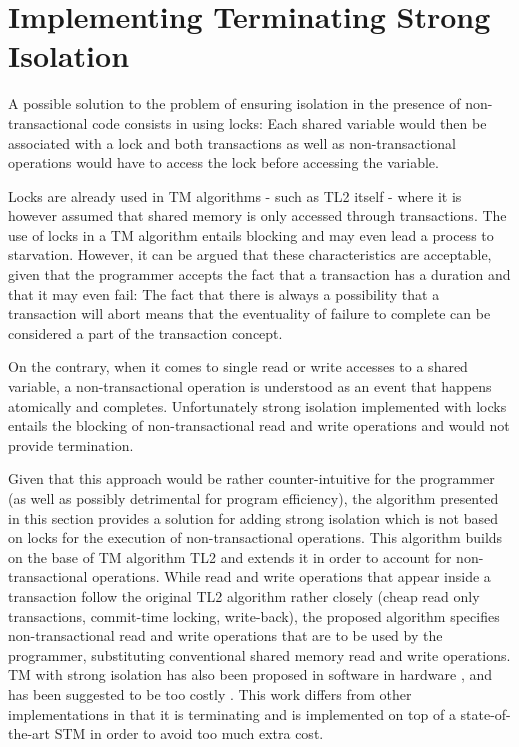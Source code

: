 \section{Implementing Terminating Strong  Isolation}
\label{sec:protocol}

A possible  solution to  the problem of  ensuring isolation   in the
presence of  non-transactional code consists in using  locks: Each shared
variable would then  
be associated with a lock and both transactions as well as non-transactional 
operations would have to access the lock before accessing the variable.

Locks are already used  in TM algorithms - such as TL2  itself - where it is
however     assumed   that  shared   memory   is   only  accessed   through
transactions. The use  of locks  in a TM algorithm  entails blocking and may
even lead a process to starvation. However,  
it can be argued that  these characteristics are acceptable, given that the
programmer  accepts the fact that a  transaction has a duration and that it
may  even  fail: The  fact  that   there is  always  a  possibility that  a
transaction will abort means that the eventuality of  
failure to complete can be considered a part of the transaction concept.  

On  the contrary,  when it  comes to single read or  write accesses  to  a shared
variable, a  non-transactional operation is  understood  as an
event  that  happens   atomically  and   completes.  Unfortunately   strong
isolation  implemented with  locks  entails the blocking  
of non-transactional read and write operations and would not provide termination.

Given that this approach would be rather counter-intuitive for the 
programmer (as well as possibly detrimental for program efficiency), 
the   algorithm presented  in this  section  provides  a solution  for adding
strong isolation which is not based on locks for the execution 
of non-transactional  operations. This  algorithm builds on  the base  of TM
algorithm  TL2 and  extends it in  order to account for  non-transactional 
operations. While read   and write operations that appear inside a 
transaction follow the original TL2 algorithm rather closely (cheap read 
only transactions, commit-time locking, write-back), 
the proposed algorithm 
specifies non-transactional read and  write operations 
that are to be used 
by the programmer, substituting conventional
shared memory read and write operations. 
TM with strong isolation has also been proposed in
software \cite{SMSA08,shpeis07} in hardware \cite{MTCM07}, and has been suggested to be too costly \cite{DS09}.
This work differs from other implementations in that it is terminating and
is implemented on top of a state-of-the-art STM in order to avoid too much extra cost.


